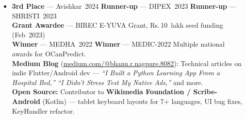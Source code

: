 \documentclass[letterpaper,11pt]{article}
\newcommand{\resumeSubHeadingListStart}{
  \begin{itemize}[leftmargin=0.13in, label={}, itemsep=2pt, parsep=0pt]
}
\newcommand{\resumeSubHeadingListEnd}{\end{itemize}}
\begin{document}
\resumeSubHeadingListStart
  \item\small{
    \textbf{3rd Place} — Avishkar~2024 \quad \textbf{Runner-up} — DIPEX~2023 \quad \textbf{Runner-up} — SHRISTI~2023 \\[2pt]
    \textbf{Grant Awardee} — BIREC E-YUVA Grant, Rs.\,10~lakh seed funding (Feb~2023) \\[2pt]
    \textbf{Winner} — MEDHA~2022 \quad \textbf{Winner} — MEDIC-2022 \quad Multiple national awards for OCanPredict. \\[2pt]
    \textbf{Medium Blog} (\href{https://medium.com/@bhanu.r.nagpure.8082}{\underline{medium.com/@bhanu.r.nagpure.8082}}): Technical articles on indie Flutter/Android dev — \textit{``I Built a Python Learning App From a Hospital Bed,''} \textit{``I Didn't Stress Test My Native Ads,''} and more. \\[2pt]
    \textbf{Open Source:} Contributor to \textbf{Wikimedia Foundation / Scribe-Android} (Kotlin) — tablet keyboard layouts for 7+ languages, UI bug fixes, KeyHandler refactor.
  }
\resumeSubHeadingListEnd
\end{document}
